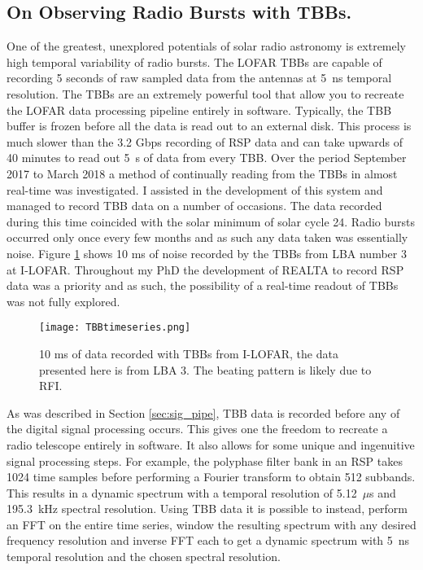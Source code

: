 \subsection{On Observing Radio Bursts with TBBs.}
One of the greatest, unexplored potentials of solar radio astronomy is extremely high temporal variability of radio bursts. The LOFAR TBBs are capable of recording 5 seconds of raw sampled data from the antennas at 5~ns temporal resolution. The TBBs are an extremely powerful tool that allow you to recreate the LOFAR data processing pipeline entirely in software. Typically, the TBB buffer is frozen before all the data is read out to an external disk. This process is much slower than the 3.2 Gbps recording of RSP data and can take upwards of 40 minutes to read out 5~s of data from every TBB. Over the period September 2017 to March 2018 a method of continually reading from the TBBs in almost real-time was investigated. I assisted in the development of this system and managed to record TBB data on a number of occasions. The data recorded during this time coincided with the solar minimum of solar cycle 24. Radio bursts occurred only once every few months and as such any data taken was essentially noise. Figure \ref{fig:TBB_timeseries} shows 10 ms of noise recorded by the TBBs from LBA number 3 at I-LOFAR.
Throughout my PhD the development of REALTA to record RSP data was a priority and as such, the possibility of a real-time readout of TBBs was not fully explored. 

%
\begin{figure}[ht]
\centering
\texttt{[image: TBBtimeseries.png]}
\caption[10 ms of data recorded with TBBs from I-LOFAR.]{10 ms of data recorded with TBBs from I-LOFAR, the data presented here is from LBA 3. The beating pattern is likely due to RFI.}
\label{fig:TBB_timeseries}
\end{figure}

As was described in Section \ref{sec:sig_pipe}, TBB data is recorded before any of the digital signal processing occurs. This gives one the freedom to recreate a radio telescope entirely in software. It also allows for some unique and ingenuitive signal processing steps. For example, the polyphase filter bank in an RSP takes 1024 time samples before performing a Fourier transform to obtain 512 subbands. This results in a dynamic spectrum with a temporal resolution of 5.12~$\mu$s and 195.3~kHz spectral resolution. Using TBB data it is possible to instead, perform an FFT on the entire time series, window the resulting spectrum with any desired frequency resolution and inverse FFT each to get a dynamic spectrum with 5~ns temporal resolution and the chosen spectral resolution. 


